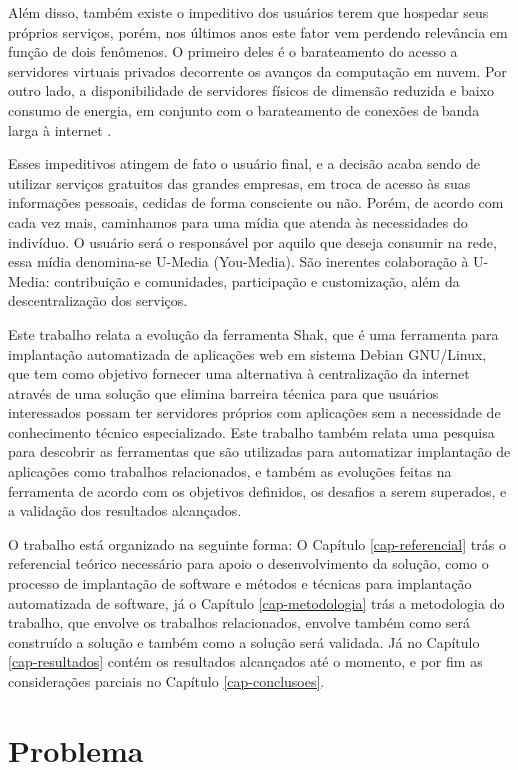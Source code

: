Além disso, também existe o impeditivo dos usuários terem que hospedar seus próprios serviços,
porém, nos últimos anos este fator vem perdendo relevância em função de
dois fenômenos. O primeiro deles é o barateamento do acesso a servidores virtuais
privados decorrente os avanços da computação em nuvem. Por outro lado, a
disponibilidade de servidores físicos de dimensão reduzida e baixo consumo de
energia, em conjunto com o barateamento de conexões de banda larga à internet \cite{shak2015}.

Esses impeditivos atingem de fato o usuário final, e a decisão
acaba sendo de utilizar serviços gratuitos das grandes empresas, em troca de acesso
às suas informações pessoais, cedidas de forma consciente ou não. Porém, de acordo
com \cite{terra2006comunicaccao} cada vez mais, caminhamos
para uma mídia que atenda às necessidades do indivíduo. O usuário será o responsável
por aquilo que deseja consumir na rede, essa mídia denomina-se U-Media (You-Media).
São inerentes colaboração à U-Media: contribuição e comunidades, participação
e customização, além da descentralização dos serviços.

Este trabalho relata a evolução da ferramenta Shak, que é uma ferramenta para implantação
automatizada de aplicações web em sistema Debian GNU/Linux, que tem como objetivo fornecer
uma alternativa à centralização da internet através de uma solução que elimina
barreira técnica para que usuários interessados possam ter servidores próprios
com aplicações sem a necessidade de conhecimento
técnico especializado. Este trabalho também relata uma pesquisa para
descobrir as ferramentas que são utilizadas para automatizar implantação de aplicações
como trabalhos relacionados, e também as evoluções feitas na ferramenta de acordo
com os objetivos definidos, os desafios a serem superados, e a validação dos
resultados alcançados.

O trabalho está organizado na seguinte forma:  O Capítulo \ref{cap-referencial}
trás o referencial teórico necessário para apoio o desenvolvimento da solução,
como o processo de implantação de software e métodos e técnicas para implantação
automatizada de software, já o Capítulo \ref{cap-metodologia}
trás a metodologia do trabalho, que envolve os trabalhos relacionados, envolve também
como será construído a solução e também como a solução será validada. Já no Capítulo
\ref{cap-resultados} contém os resultados alcançados até o momento, e por fim as
considerações parciais no Capítulo \ref{cap-conclusoes}.

\section{Problema}

